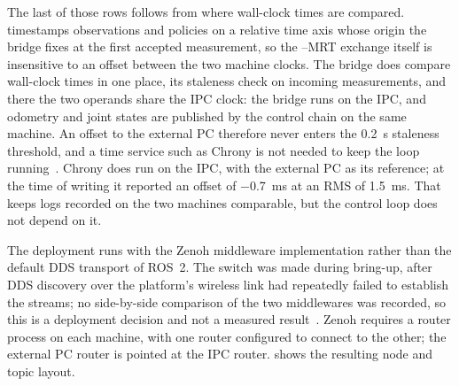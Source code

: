 The last of those rows follows from where wall-clock times are compared.
\ocs{} timestamps observations and policies on a relative time axis
whose origin the bridge fixes at the first accepted measurement, so the
\mpc{}--MRT exchange itself is insensitive to an offset between the two
machine clocks. The bridge does compare wall-clock times in one place,
its staleness check on incoming measurements, and there the two operands
share the IPC clock: the bridge runs on the IPC, and odometry and joint
states are published by the control chain on the same machine. An offset
to the external PC therefore never enters the \qty{0.2}{\second}
staleness threshold, and a time service such as Chrony is not needed to
keep the loop running~\cite{Chrony}. Chrony does run on the IPC, with
the external PC as its reference; at the time of writing it reported an
offset of \qty{-0.7}{\milli\second} at an RMS of
\qty{1.5}{\milli\second}. That keeps logs recorded on the two machines
comparable, but the control loop does not depend on it.

The deployment runs with the Zenoh middleware implementation rather than
the default DDS transport of ROS~2. The switch was made during
bring-up, after DDS discovery over the platform's wireless link had
repeatedly failed to establish the \ocs{} streams; no side-by-side
comparison of the two middlewares was recorded, so this is a deployment
decision and not a measured result~\cite{zenoh,Macenski2022ROS2}.
Zenoh requires a router process on each machine, with one router
configured to connect to the other; the external PC router is pointed at
the IPC router.  shows the resulting node and
topic layout.

